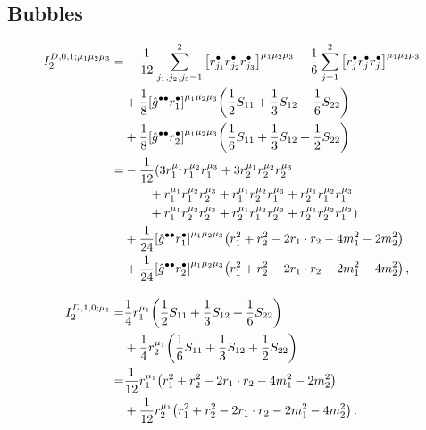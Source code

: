 \documentclass[11pt,a4paper]{refrep}
\begin{document}
\subsection*{Bubbles}
\begin{subequations}
\begin{align}
    I_2^{D,0,1;\mu_1\mu_2\mu_3} =& -\frac{1}{12}\sum_{j_1,j_2,j_3=1}^2\qty[r_{j_1}^\bullet r_{j_2}^\bullet r_{j_3}^\bullet]^{\mu_1\mu_2\mu_3} -\frac{1}{6}\sum_{j=1}^2\qty[r_j^\bullet r_j^\bullet r_j^\bullet]^{\mu_1\mu_2\mu_3}\notag\\
      &+\frac{1}{8}\qty[\hat{g}^{\bullet\bullet}r_1^\bullet]^{\mu_1\mu_2\mu_3}\qty(\frac{1}{2}S_{11}+\frac{1}{3}S_{12}+\frac{1}{6}S_{22})\notag\\
      &+\frac{1}{8}\qty[\hat{g}^{\bullet\bullet}r_2^\bullet]^{\mu_1\mu_2\mu_3}\qty(\frac{1}{6}S_{11}+\frac{1}{3}S_{12}+\frac{1}{2}S_{22})\notag\\
      =& -\frac{1}{12}(3r_1^{\mu_1}r_1^{\mu_2}r_1^{\mu_3}+3r_2^{\mu_1}r_2^{\mu_2}r_2^{\mu_3}\notag\\
      &\qquad+r_1^{\mu_1}r_1^{\mu_2}r_2^{\mu_3}+r_1^{\mu_1}r_2^{\mu_2}r_1^{\mu_3}+r_2^{\mu_1}r_1^{\mu_2}r_1^{\mu_3}\notag\\
      &\qquad+r_1^{\mu_1}r_2^{\mu_2}r_2^{\mu_3}+r_2^{\mu_1}r_1^{\mu_2}r_2^{\mu_3}+r_2^{\mu_1}r_2^{\mu_2}r_1^{\mu_3})\notag\\
      &+\frac{1}{24}\qty[\hat{g}^{\bullet\bullet}r_1^\bullet]^{\mu_1\mu_2\mu_3}\qty(r_1^2+r_2^2-2r_1\cdot r_2-4m_1^2-2m_2^2)\notag\\
      &+\frac{1}{24}\qty[\hat{g}^{\bullet\bullet}r_2^\bullet]^{\mu_1\mu_2\mu_3}\qty(r_1^2+r_2^2-2r_1\cdot r_2-2m_1^2-4m_2^2)\,,\\[10pt]
%
    I_2^{D,1,0;\mu_1} =& \frac{1}{4}r_1^{\mu_1}\qty(\frac{1}{2}S_{11}+\frac{1}{3}S_{12}+\frac{1}{6}S_{22})\notag\\
      &+\frac{1}{4}r_2^{\mu_1}\qty(\frac{1}{6}S_{11}+\frac{1}{3}S_{12}+\frac{1}{2}S_{22})\notag\\
      =& \frac{1}{12}r_1^{\mu_1}\qty(r_1^2+r_2^2-2r_1\cdot r_2-4m_1^2-2m_2^2)\notag\\
      &+\frac{1}{12}r_2^{\mu_1}\qty(r_1^2+r_2^2-2r_1\cdot r_2-2m_1^2-4m_2^2)\,.%
%
\end{align}
\end{subequations}
\end{document}

